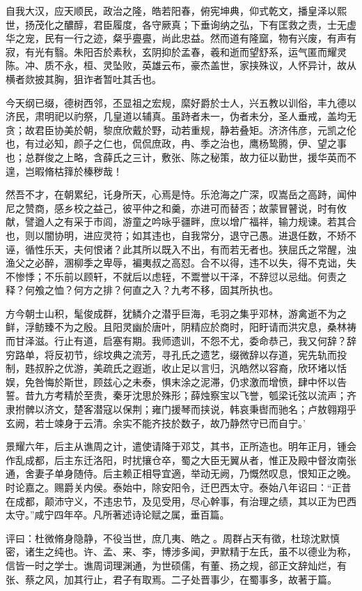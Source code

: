 \documentclass[12pt,UTF8]{ctexbook}
\begin{document}
自我大汉，应天顺民，政治之隆，皓若阳春，俯宪坤典，仰式乾文，播皇泽以熙世，扬茂化之醲醇，君臣履度，各守厥真；下垂询纳之弘，下有匡救之责，士无虚华之宠，民有一行之迹，粲乎亹亹，尚此忠益。然而道有隆窳，物有兴废，有声有寂，有光有翳。朱阳否於素秋，玄阴抑於孟春，羲和逝而望舒系，运气匿而耀灵陈。冲、质不永，桓、灵坠败，英雄云布，豪杰盖世，家挟殊议，人怀异计，故从横者欻披其胸，狙诈者暂吐其舌也。

今天纲已缀，德树西邻，丕显祖之宏规，縻好爵於士人，兴五教以训俗，丰九德以济民，肃明祀以礿祭，几皇道以辅真。虽跱者未一，伪者未分，圣人垂戒，盖均无贪；故君臣协美於朝，黎庶欣戴於野，动若重规，静若叠矩。济济伟彦，元凯之伦也，有过必知，颜子之仁也，侃侃庶政，冉、季之治也，鹰杨鸷腾，伊、望之事也；总群俊之上略，含薛氏之三计，敷张、陈之秘策，故力征以勤世，援华英而不遑，岂暇脩枯箨於榛秽哉！

然吾不才，在朝累纪，讬身所天，心焉是恃。乐沧海之广深，叹嵩岳之高跱，闻仲尼之赞商，感乡校之益己，彼平仲之和羹，亦进可而替否；故蒙冒瞽说，时有攸献，譬遒人之有采于市闾，游童之吟咏乎疆畔，庶以增广福祥，输力规谏。若其合也，则以闇协明，进应灵符；如其违也，自我常分，退守己愚。进退任数，不矫不诬，循性乐天，夫何恨诸？此其所以既入不出，有而若无者也。狭屈氏之常醒，浊渔父之必醉，溷柳季之卑辱，褊夷叔之高怼。合不以得，违不以失，得不克诎，失不惨悸；不乐前以顾轩，不就后以虑轾，不鬻誉以干泽，不辞愆以忌绌。何责之释？何飧之恤？何方之排？何直之入？九考不移，固其所执也。

方今朝士山积，髦俊成群，犹鳞介之潜乎巨海，毛羽之集乎邓林，游禽逝不为之鲜，浮鲂臻不为之殷。且阳灵幽於唐叶，阴精应於商时，阳盱请而洪灾息，桑林祷而甘泽滋。行止有道，启塞有期。我师遗训，不怨不尤，委命恭己，我又何辞？辞穷路单，将反初节，综坟典之流芳，寻孔氏之遗艺，缀微辞以存道，宪先轨而投制，韪叔肸之优游，美疏氏之遐逝，收止足以言归，汎皓然以容裔，欣环堵以恬娱，免咎悔於斯世，顾兹心之未泰，惧末涂之泥滞，仍求激而增愤，肆中怀以告誓。昔九方考精於至贵，秦牙沈思於殊形；薛烛察宝以飞誉，瓠梁讬弦以流声；齐隶拊髀以济文，楚客潜寇以保荆；雍门援琴而挟说，韩哀秉辔而驰名；卢敖翱翔乎玄阙，若士竦身于云清。余实不能齐技於数子，故乃静然守已而自宁。’

景耀六年，后主从谯周之计，遣使请降于邓艾，其书，正所造也。明年正月，锺会作乱成都，后主东迁洛阳，时扰攘仓卒，蜀之大臣无翼从者，惟正及殿中督汝南张通，舍妻子单身随侍。后主赖正相导宜適，举动无阙，乃慨然叹息，恨知正之晚。时论嘉之。赐爵关内侯。泰始中，除安阳令，迁巴西太守。泰始八年诏曰：“正昔在成都，颠沛守义，不违忠节，及见受用，尽心幹事，有治理之绩，其以正为巴西太守。”咸宁四年卒。凡所著述诗论赋之属，垂百篇。

评曰：杜微脩身隐静，不役当世，庶几夷、皓之。周群占天有徵，杜琼沈默慎密，诸生之纯也。许、孟、来、李，博涉多闻，尹默精于左氏，虽不以德业为称，信皆一时之学士。谯周词理渊通，为世硕儒，有董、扬之规，郤正文辞灿烂，有张、蔡之风，加其行止，君子有取焉。二子处晋事少，在蜀事多，故著于篇。
\end{document}

